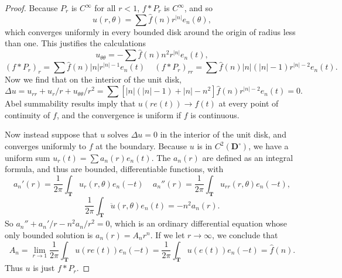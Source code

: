 \begin{proof}
	Because $P_r$ is $C^\infty$ for all $r < 1$, $f * P_r$ is $C^\infty$, and so
    \[ u(r,\theta) = \sum \widehat{f}(n) r^{|n|} e_n(\theta), \]
    which converges uniformly in every bounded disk around the origin of radius less than one. This justifies the calculations
    \[ u_{\theta \theta} = - \sum \widehat{f}(n) n^2 r^{|n|} e_n(t), \]
    \[ (f * P_r)_r = \sum \widehat{f}(n) |n| r^{|n|-1} e_n(t)\ \ \ \ \ (f * P_r)_{rr} = \sum \widehat{f}(n) |n| (|n| - 1) r^{|n|-2} e_n(t). \]
    Now we find that on the interior of the unit disk,
    \[ \Delta u = u_{rr} + u_r/r + u_{\theta \theta}/r^2 = \sum [|n|(|n|-1) + |n| - n^2] \widehat{f}(n) r^{|n|-2} e_n(t) = 0. \]
    Abel summability results imply that $u(re(t)) \to f(t)$ at every point of continuity of $f$, and the convergence is uniform if $f$ is continuous.

	Now instead suppose that $u$ solves $\Delta u = 0$ in the interior of the unit disk, and converges uniformly to $f$ at the boundary. Because $u$ is in $C^2(\mathbf{D}^\circ)$, we have a uniform sum $u_r(t) = \sum a_n(r) e_n(t)$. The $a_n(r)$ are defined as an integral formula, and thus are bounded, differentiable functions, with
    \[ a_n'(r) = \frac{1}{2\pi} \int_{\mathbf{T}} u_r(r,\theta) e_n(-t)\ \ \ \ \ a_n''(r) = \frac{1}{2\pi} \int_{\mathbf{T}} u_{rr}(r,\theta) e_n(-t), \]
    \[ \frac{1}{2\pi} \int_{\mathbf{T}} \ddot{u}(r,\theta) e_n(t) = - n^2 a_n(r). \]
    So $a_n'' + a_n'/r - n^2 a_n/r^2 = 0$, which is an ordinary differential equation whose only bounded solution is $a_n(r) = A_nr^n$. If we let $r \to \infty$, we conclude that
    \[ A_n = \lim_{r \to 1} \frac{1}{2\pi} \int_{\mathbf{T}} u(re(t)) e_n(-t) = \frac{1}{2\pi} \int_{\mathbf{T}} u(e(t)) e_n(-t) = \widehat{f}(n). \]
    Thus $u$ is just $f * P_r$.
\end{proof}


